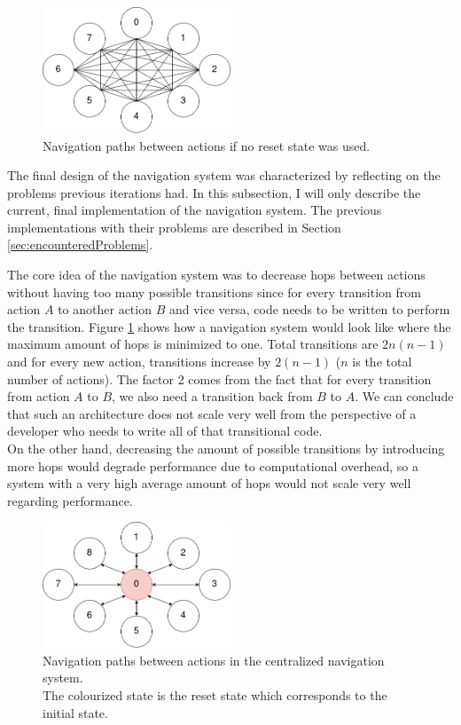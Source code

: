 \begin{figure}
\centering
\includegraphics[width=0.5\textwidth]{figures/navigationsystem-diagram/navigationsystem-all-overview.png}
\caption[Navigation paths (no reset state)]{Navigation paths between actions if no reset state was used.}
\label{fig:navsystem.all.overview}
\end{figure}

The final design of the navigation system was characterized by reflecting on the problems previous iterations had. In this subsection, I will only describe the current, final implementation of the navigation system. The previous implementations with their problems are described in Section \ref{sec:encounteredProblems}.

The core idea of the navigation system was to decrease hops between actions without having too many possible transitions since for every transition from action $A$ to another action $B$ and vice versa, code needs to be written to perform the transition. Figure \ref{fig:navsystem.all.overview} shows how a navigation system would look like where the maximum amount of hops is minimized to one. Total transitions are $2n(n-1)$ and for every new action, transitions increase by $2(n-1)$ ($n$ is the total number of actions). The factor 2 comes from the fact that for every transition from action $A$ to $B$, we also need a transition back from $B$ to $A$. We can conclude that such an architecture does not scale very well from the perspective of a developer who needs to write all of that transitional code. \\
On the other hand, decreasing the amount of possible transitions by introducing more hops would degrade performance due to computational overhead, so a system with a very high average amount of hops would not scale very well regarding performance.

\begin{figure}
\centering
\includegraphics[width=0.5\textwidth]{figures/navigationsystem-diagram/navigationsystem-central-overview.png}
\caption[Navigation paths in centralized navigation system]{Navigation paths between actions in the centralized navigation system. \\The colourized state is the reset state which corresponds to the initial state.}
\label{fig:navsystem.central.overview}
\end{figure}

